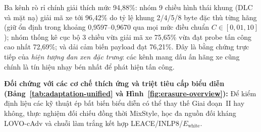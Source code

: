 \documentclass[12pt, a4paper, reqno, oneside]{book}
\begin{document}
Ba kênh rò rỉ chính giải thích mức 94,88\%: nhóm 9 chiều hình thái khung (DLC và mặt nạ) giải mã xe tới 96,42\% do tỷ lệ khung 2/4/5/8 byte đặc thù từng hãng (giữ ổn định trong khoảng 0,9597--0,9670 qua mọi mức điều chuẩn $C \in [0{,}01, 10]$); nhóm thống kê cục bộ 3 chiều vừa giải mã xe 75,65\% vừa đạt probe tấn công cao nhất 72,69\%; và dải cảm biến payload đạt 76,21\%. Đây là bằng chứng trực tiếp của \textit{hiện tượng đan xen đặc trưng}: các kênh mang dấu ấn hãng xe cũng chính là tín hiệu nhạy bén nhất để phát hiện tấn công.

\textbf{Đối chứng với các cơ chế thích ứng và triệt tiêu cấp biểu diễn (Bảng~\ref{tab:adaptation-unified} và Hình~\ref{fig:erasure-overview}):} Để kiểm định liệu các kỹ thuật ép bất biến biểu diễn có thể thay thế Giai đoạn~II hay không, thực nghiệm đối chiếu đồng thời MixStyle, học đa nguồn đối kháng LOVO-cAdv và chuỗi làm trắng kết hợp LEACE/INLP8/$E_{\text{white}}$.
\end{document}
